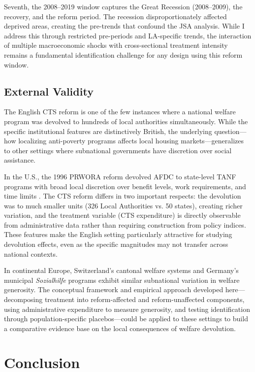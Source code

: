 \documentclass[12pt]{article}
\begin{document}
Seventh, the 2008--2019 window captures the Great Recession (2008--2009), the recovery, and the reform period. The recession disproportionately affected deprived areas, creating the pre-trends that confound the JSA analysis. While I address this through restricted pre-periods and LA-specific trends, the interaction of multiple macroeconomic shocks with cross-sectional treatment intensity remains a fundamental identification challenge for any design using this reform window.

\subsection{External Validity}

The English CTS reform is one of the few instances where a national welfare program was devolved to hundreds of local authorities simultaneously. While the specific institutional features are distinctively British, the underlying question---how localizing anti-poverty programs affects local housing markets---generalizes to other settings where subnational governments have discretion over social assistance.

In the U.S., the 1996 PRWORA reform devolved AFDC to state-level TANF programs with broad local discretion over benefit levels, work requirements, and time limits \citep{blank2002}. The CTS reform differs in two important respects: the devolution was to much smaller units (326 Local Authorities vs. 50 states), creating richer variation, and the treatment variable (CTS expenditure) is directly observable from administrative data rather than requiring construction from policy indices. These features make the English setting particularly attractive for studying devolution effects, even as the specific magnitudes may not transfer across national contexts.

In continental Europe, Switzerland's cantonal welfare systems and Germany's municipal \textit{Sozialhilfe} programs exhibit similar subnational variation in welfare generosity. The conceptual framework and empirical approach developed here---decomposing treatment into reform-affected and reform-unaffected components, using administrative expenditure to measure generosity, and testing identification through population-specific placebos---could be applied to these settings to build a comparative evidence base on the local consequences of welfare devolution.

\section{Conclusion}\label{sec:conclusion}
\end{document}
